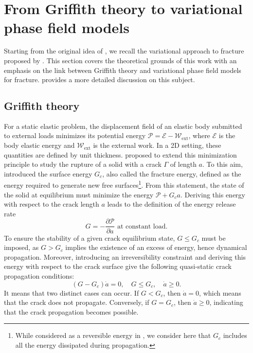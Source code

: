\documentclass[OptSoft]{jtcam_preprint}
\begin{document}
\section{From Griffith theory to variational phase field models}
\label{sec:variational_approach_to_fracture}

Starting from the original idea of \textcite{griffith_phenomena_1920}, we recall the variational approach to fracture proposed by \textcite{francfort_revisiting_1998}.
This section covers the theoretical grounds of this work with an emphasis on the link between Griffith theory and variational phase field models for fracture.
\textcite{bourdin_variational_2008} provides a more detailed discussion on this subject.

\subsection{Griffith theory}

For a static elastic problem, the displacement field of an elastic body submitted to external loads minimizes its potential energy $\mathcal{P} = \mathcal{E} - \mathcal{W}_{\mathrm{ext}}$, where $\mathcal{E}$ is the body elastic energy and $\mathcal{W}_{\mathrm{ext}}$ is the external work. In a 2D setting, these quantities are defined by unit thickness.
\textcite{griffith_phenomena_1920} proposed to extend this minimization principle to study the rupture of a solid with a crack $\Gamma$ of length $a$.
To this aim, \textcite{griffith_phenomena_1920} introduced the surface energy $G_c$, also called the fracture energy, defined as the energy required to generate new free surfaces\footnote{While considered as a reversible energy in \textcite{griffith_phenomena_1920}, we consider here that $G_c$ includes all the energy dissipated during propagation.}.
From this statement, the state of the solid at equilibrium must minimize the energy $\mathcal{P} + G_c a$.
Deriving this energy with respect to the crack length $a$ leads to the definition of the energy release rate
\begin{equation}
G = - \frac{\partial \mathcal{P}}{\partial a} \text{ at constant load.}
\label{eq:defG}
\end{equation}
To ensure the stability of a given crack equilibrium state, $G \leq G_c$ must be imposed, as $G > G_c$ implies the existence of an excess of energy, hence dynamical propagation.
Moreover, introducing an irreversibility constraint and deriving this energy with respect to the crack surface give the following quasi-static crack  propagation conditions:
\begin{equation}
  (G - G_c) \dot{a} = 0, \quad G \leq G_c, \quad
  \dot{a} \geq 0.
  \label{eq:griffith}
\end{equation}
It means that two distinct cases can occur.
If $G < G_c$, then $\dot{a} = 0$, which means that the crack does not propagate.
  Conversely, if $G = G_c$, then $\dot{a} \geq 0$, indicating that the crack propagation becomes possible.
\end{document}
